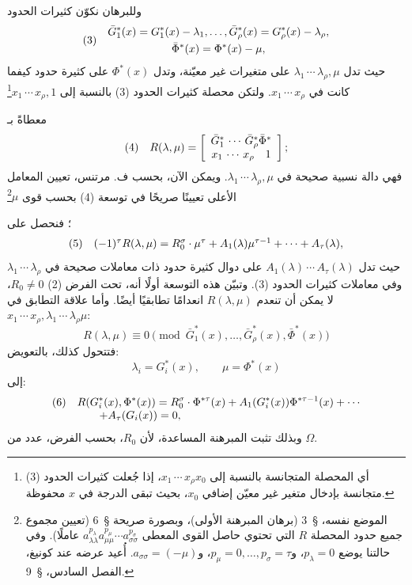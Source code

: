 \documentclass[11pt]{article}
\newcommand{\srcLTR}[1]{\relax\ifmmode\text{\mbox{\babelsublr{\foreignlanguage{english}{#1}}}}\else\babelsublr{\foreignlanguage{english}{#1}}\fi}
\newcommand{\srcfn}[2]{\begingroup\renewcommand{\thefootnote}{\srcLTR{#1}}\footnote{#2}\addtocounter{footnote}{-1}\endgroup}
\providecommand{\rcdots}{\,\cdots\,}
\begin{document}
وللبرهان نكوّن كثيرات الحدود
\[
\begin{array}{@{}l@{\quad}c@{}}
(3)& \begin{gathered}
\bar G_1^*(x)=G_1^*(x)-\lambda_1,\ldots,\bar G_\rho^*(x)=G_\rho^*(x)-\lambda_\rho,\\
\bar\Phi^*(x)=\Phi^*(x)-\mu,
\end{gathered}
\end{array}
\]
حيث تدل $\lambda_1\rcdots\lambda_\rho,\mu$ على متغيرات غير معيّنة، وتدل $\Phi^*(x)$ على كثيرة حدود كيفما كانت في $x_1\rcdots x_\rho$. ولتكن محصلة كثيرات الحدود (3) بالنسبة إلى $x_1\rcdots x_\rho,1$\srcfn{**)}{أي المحصلة المتجانسة بالنسبة إلى $x_1\rcdots x_\rho x_0$، إذا جُعلت كثيرات الحدود (3) متجانسة بإدخال متغير غير معيّن إضافي $x_0$، بحيث تبقى الدرجة في $x$ محفوظة.} معطاةً بـ
\[
\begin{array}{@{}l@{\quad}c@{}}
(4)& \displaystyle R(\lambda,\mu)=\left[\begin{array}{cc} \bar G_1^*\rcdots \bar G_\rho^*\bar\Phi^*\\ x_1\rcdots x_\rho\quad 1\end{array}\right];
\end{array}
\]
فهي دالة نسبية صحيحة في $\lambda_1\rcdots\lambda_\rho,\mu$. ويمكن الآن، بحسب ف. مرتنس، تعيين المعامل الأعلى تعيينًا صريحًا في توسعة (4) بحسب قوى $\mu$\srcfn{***)}{الموضع نفسه، \S\ 3 (برهان المبرهنة الأولى)، وبصورة صريحة \S\ 6 (تعيين مجموع جميع حدود المحصلة $R$ التي تحتوي حاصل القوى المعطى $a_{\lambda\lambda}^{p_\lambda}a_{\mu\mu}^{p_\mu}\cdots a_{\sigma\sigma}^{p_\sigma}$ عاملًا). وفي حالتنا يوضع $p_\lambda=0$، و$p_\mu=0,\ldots,p_\sigma=\tau$، و$a_{\sigma\sigma}=(-\mu)$. أُعيد عرضه عند كونيغ، الفصل السادس، \S\ 9.}؛ فنحصل على
\[
\begin{array}{@{}l@{\quad}c@{}}
(5)& (-1)^\tau R(\lambda,\mu)=R_0^\sigma\cdot\mu^\tau+A_1(\lambda)\mu^{\tau-1}+\cdots+A_\tau(\lambda),
\end{array}
\]
حيث تدل $A_1(\lambda)\rcdots A_\tau(\lambda)$ على دوال كثيرة حدود ذات معاملات صحيحة في $\lambda_1\rcdots\lambda_\rho$ وفي معاملات كثيرات الحدود (3). وتبيّن هذه التوسعة أولًا أنه، تحت الفرض (2) $R_0\ne0$، لا يمكن أن تنعدم $R(\lambda,\mu)$ انعدامًا تطابقيًا أيضًا. وأما علاقة التطابق في $x_1\rcdots x_\rho,\lambda_1\rcdots\lambda_\rho\mu$:
\[
R(\lambda,\mu)\equiv0\pmod{\bar G_1^*(x),\ldots,\bar G_\rho^*(x),\bar\Phi^*(x)}
\]
فتتحول كذلك، بالتعويض:
\[
\lambda_i=G_i^*(x),\qquad \mu=\Phi^*(x)
\]
إلى:
\[
\begin{array}{@{}l@{\quad}l@{}}
(6)& \displaystyle R(G_i^*(x),\Phi^*(x))=R_0^\sigma\cdot\Phi^{*\tau}(x)+A_1(G_i^*(x))\Phi^{*\tau-1}(x)+\cdots\\
& \displaystyle\qquad +A_\tau(G_i(x))=0,
\end{array}
\]
وبذلك تثبت المبرهنة المساعدة، لأن $R_0$، بحسب الفرض، عدد من $\Omega$.
\end{document}
